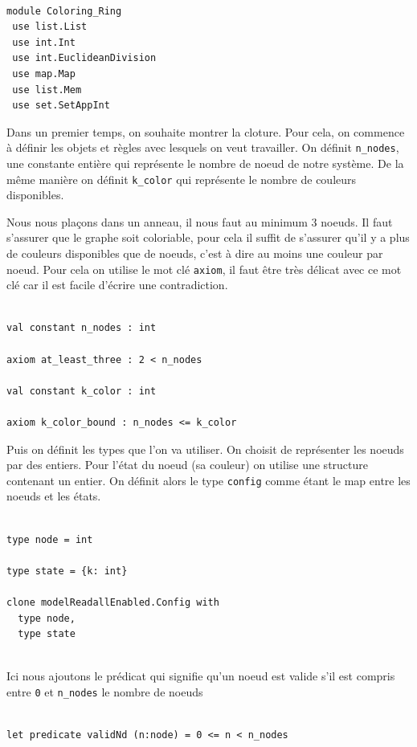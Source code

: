 \documentclass[11pt]{article}
\begin{document}
\lstset{language=why3,label= ,caption= ,captionpos=b,numbers=none}
\begin{lstlisting}

module Coloring_Ring
 use list.List
 use int.Int
 use int.EuclideanDivision
 use map.Map
 use list.Mem
 use set.SetAppInt

\end{lstlisting}

Dans un premier temps, on souhaite montrer la cloture.
Pour cela, on commence à définir les objets et règles avec lesquels on veut travailler. 
On définit \texttt{n\_nodes}, une constante entière qui représente le nombre de noeud de notre système. 
De la même manière on définit \texttt{k\_color} qui représente le nombre de couleurs disponibles.

Nous nous plaçons dans un anneau, il nous faut au minimum 3 noeuds. 
Il faut s'assurer que le graphe soit coloriable, pour cela il suffit de s'assurer qu'il y a plus de couleurs disponibles que de noeuds, c'est à dire au moins une couleur par noeud. 
Pour cela on utilise le mot clé \texttt{axiom}, il faut être très délicat avec ce mot clé car il est facile d'écrire une contradiction. 

\lstset{language=why3,label= ,caption= ,captionpos=b,numbers=none}
\begin{lstlisting}

val constant n_nodes : int

axiom at_least_three : 2 < n_nodes

val constant k_color : int

axiom k_color_bound : n_nodes <= k_color

\end{lstlisting}
Puis on définit les types que l'on va utiliser. 
On choisit de représenter les noeuds par des entiers.
Pour l'état du noeud (sa couleur) on utilise une structure contenant un entier.
On définit alors le type \texttt{config} comme étant le map entre les noeuds et les états.


\lstset{language=why3,label= ,caption= ,captionpos=b,numbers=none}
\begin{lstlisting}

type node = int

type state = {k: int}

clone modelReadallEnabled.Config with
  type node,
  type state


\end{lstlisting}
Ici nous ajoutons le prédicat qui signifie qu'un noeud est valide s'il est compris entre \texttt{0} et \texttt{n\_nodes} le nombre de noeuds
\lstset{language=why3,label= ,caption= ,captionpos=b,numbers=none}
\begin{lstlisting}

let predicate validNd (n:node) = 0 <= n < n_nodes

\end{lstlisting}
\end{document}
